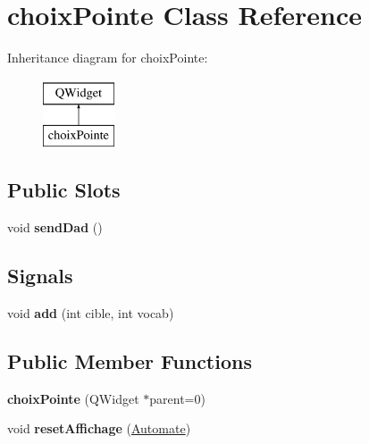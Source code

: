 \hypertarget{classchoix_pointe}{\section{choix\-Pointe Class Reference}
\label{classchoix_pointe}
}
Inheritance diagram for choix\-Pointe\-:\begin{figure}[H]
\begin{center}
\leavevmode
\includegraphics[height=2.000000cm]{classchoix_pointe}
\end{center}
\end{figure}
\subsection*{Public Slots}
\begin{DoxyCompactItemize}
\item 
\hypertarget{classchoix_pointe_ac8ccad58270933a4950d5c6e2cc74168}{void {\bfseries send\-Dad} ()}\label{classchoix_pointe_ac8ccad58270933a4950d5c6e2cc74168}

\end{DoxyCompactItemize}
\subsection*{Signals}
\begin{DoxyCompactItemize}
\item 
\hypertarget{classchoix_pointe_a586763c92b709e2e5d0b27c412e62ec2}{void {\bfseries add} (int cible, int vocab)}\label{classchoix_pointe_a586763c92b709e2e5d0b27c412e62ec2}

\end{DoxyCompactItemize}
\subsection*{Public Member Functions}
\begin{DoxyCompactItemize}
\item 
\hypertarget{classchoix_pointe_adb585f204f3b658650d3a4b42d871e04}{{\bfseries choix\-Pointe} (Q\-Widget $\ast$parent=0)}\label{classchoix_pointe_adb585f204f3b658650d3a4b42d871e04}

\item 
\hypertarget{classchoix_pointe_a8c91319071281be73b5d762dfa985bbd}{void {\bfseries reset\-Affichage} (\hyperlink{class_automate}{Automate})}\label{classchoix_pointe_a8c91319071281be73b5d762dfa985bbd}

\end{DoxyCompactItemize}
